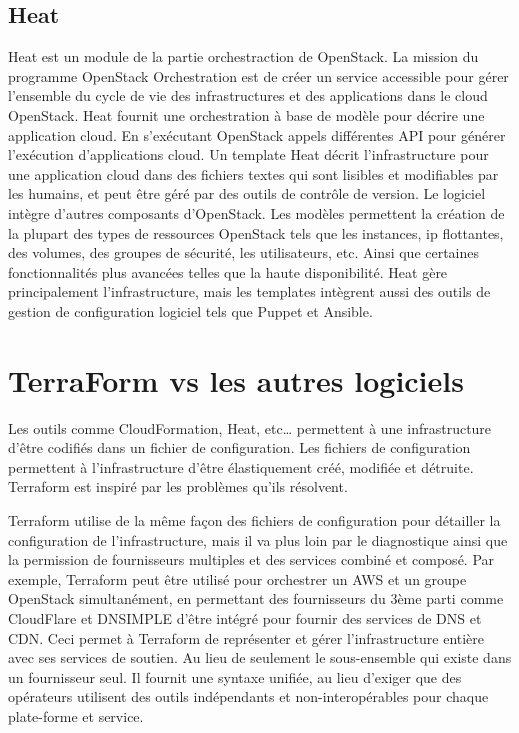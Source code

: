 \documentclass[]{article}
\begin{document}
\subsection{Heat}\label{heat}

Heat est un module de la partie orchestraction de OpenStack. La mission
du programme OpenStack Orchestration est de créer un service accessible
pour gérer l'ensemble du cycle de vie des infrastructures et des
applications dans le cloud OpenStack. Heat fournit une orchestration à
base de modèle pour décrire une application cloud. En s'exécutant
OpenStack appels différentes API pour générer l'exécution d'applications
cloud. Un template Heat décrit l'infrastructure pour une application
cloud dans des fichiers textes qui sont lisibles et modifiables par les
humains, et peut être géré par des outils de contrôle de version. Le
logiciel intègre d'autres composants d'OpenStack. Les modèles permettent
la création de la plupart des types de ressources OpenStack tels que les
instances, ip flottantes, des volumes, des groupes de sécurité, les
utilisateurs, etc. Ainsi que certaines fonctionnalités plus avancées
telles que la haute disponibilité. Heat gère principalement
l'infrastructure, mais les templates intègrent aussi des outils de
gestion de configuration logiciel tels que Puppet et Ansible.

\section{TerraForm vs les autres
logiciels}\label{terraform-vs-les-autres-logiciels}

Les outils comme CloudFormation, Heat, etc\ldots{} permettent à une
infrastructure d'être codifiés dans un fichier de configuration. Les
fichiers de configuration permettent à l'infrastructure d'être
élastiquement créé, modifiée et détruite. Terraform est inspiré par les
problèmes qu'ils résolvent.

Terraform utilise de la même façon des fichiers de configuration pour
détailler la configuration de l'infrastructure, mais il va plus loin par
le diagnostique ainsi que la permission de fournisseurs multiples et des
services combiné et composé. Par exemple, Terraform peut être utilisé
pour orchestrer un AWS et un groupe OpenStack simultanément, en
permettant des fournisseurs du 3ème parti comme CloudFlare et DNSIMPLE
d'être intégré pour fournir des services de DNS et CDN. Ceci permet à
Terraform de représenter et gérer l'infrastructure entière avec ses
services de soutien. Au lieu de seulement le sous-ensemble qui existe
dans un fournisseur seul. Il fournit une syntaxe unifiée, au lieu
d'exiger que des opérateurs utilisent des outils indépendants et
non-interopérables pour chaque plate-forme et service.
\end{document}
